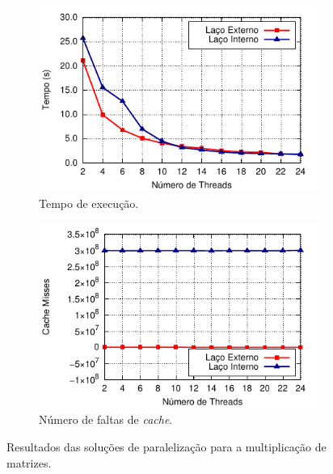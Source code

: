 \documentclass{SBCbookchapter}
\begin{document}
		\begin{figure}[t]
			\captionsetup[subfigure]{justification=centering}
			\centering
				\begin{subfigure}{0.47\linewidth}
					\includegraphics[width=\linewidth]{img/mm}
					\caption{Tempo de execução.}
					\label{figure: time mm}
				\end{subfigure}
				\quad
				\begin{subfigure}{0.47\linewidth}
					\includegraphics[width=\linewidth]{img/mm-cache}
					\caption{Número de faltas de \textit{cache}.}
					\label{figure: cache misses mm}
				\end{subfigure}
				\caption{Resultados das soluções de paralelização para a
				multiplicação de matrizes.}
		\end{figure}
			
\end{document}
